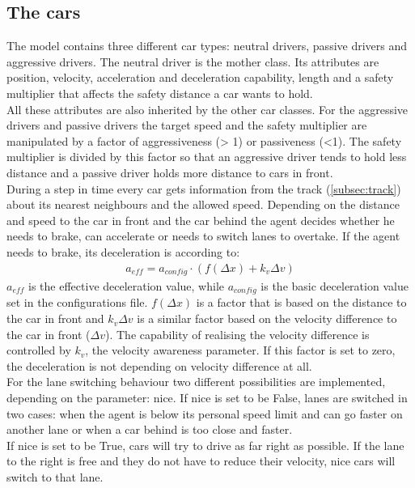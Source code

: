 \documentclass[11pt,a4paper,twocolumn]{article}
\begin{document}
\subsection{The cars} \label{subsec:cars}
The model contains three different car types: neutral drivers, passive drivers and aggressive drivers. The neutral driver is the mother class. Its attributes are position, velocity, acceleration and deceleration capability, length and a safety multiplier that affects the safety distance a car wants to hold. \\
All these attributes are also inherited by the other car classes. 
For the aggressive drivers and passive drivers the target speed and the safety multiplier are manipulated by a factor of aggressiveness (> 1) or passiveness (<1). The safety multiplier is divided by this factor so that an aggressive driver tends to hold less distance and a passive driver holds more distance to cars in front. \\
During a step in time every car gets information from the track (\ref{subsec:track}) about its nearest neighbours and the allowed speed. Depending on the distance and speed to the car in front and the car behind the agent decides whether he needs to brake, can accelerate or needs to switch lanes to overtake. If the agent needs to brake, its deceleration is according to:
\begin{align*}
\label{eq:velo_param}
a_{eff} = a_{config} \cdot (f(\Delta x) + k_v \Delta v)
\end{align*}
$a_{eff}$ is the effective deceleration value, while $a_{config}$ is the basic deceleration value set in the configurations file. $f(\Delta x)$ is a factor that is based on the distance to the car in front and $k_v \Delta v$ is a similar factor based on the velocity difference to the car in front ($\Delta v$). The capability of realising the velocity difference is controlled by $k_v$, the velocity awareness parameter. If this factor is set to zero, the deceleration is not depending on velocity difference at all.\\
For the lane switching behaviour two different possibilities are implemented, depending on the parameter: nice. If nice is set to be False, lanes are switched in two cases: when the agent is below its personal speed limit and can go faster on another lane or when a car behind is too close and faster.\\
If nice is set to be True, cars will try to drive as far right as possible. If the lane to the right is free and they do not have to reduce their velocity, nice cars will switch to that lane. 
\end{document}
